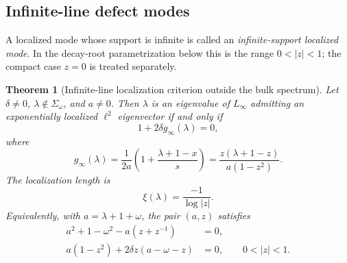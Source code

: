 \documentclass[twoside,10pt]{article}
\numberwithin{equation}{section}
\theoremstyle{slbody}
\newtheorem{theorem}{Theorem}[section]
\theoremstyle{definition}
\theoremstyle{remark}
\begin{document}
\subsection{Infinite-line defect modes}

A localized mode whose support is infinite is called an
\emph{infinite-support localized mode}.  In the decay-root parametrization
below this is the range $0<|z|<1$; the compact case $z=0$ is treated
separately.

\begin{theorem}[Infinite-line localization criterion outside the bulk spectrum]
\label{thm:localization}
Let $\delta\ne0$, $\lambda\notin\Sigma_\omega$, and $a\ne0$.  Then
$\lambda$ is an eigenvalue of $L_\infty$ admitting an exponentially
localized $\ell^2$ eigenvector if and only if
\begin{equation}\label{eq:localization-secular}
 1+2\delta g_\infty(\lambda)=0,
\end{equation}
where
\begin{equation}\label{eq:localization-green}
 g_\infty(\lambda)
 =\frac1{2a}\left(1+\frac{\lambda+1-x}{s}\right)
 =\frac{z(\lambda+1-z)}{a(1-z^2)}.
\end{equation}
The localization length is
\[
 \xi(\lambda)=\frac{-1}{\log|z|}.
\]
Equivalently, with $a=\lambda+1+\omega$, the pair $(a,z)$ satisfies
\begin{align}
 a^2+1-\omega^2-a(z+z^{-1})&=0,\label{eq:loc-dispersion}\\
 a(1-z^2)+2\delta z(a-\omega-z)&=0,
 \qquad 0<|z|<1.\label{eq:loc-match}
\end{align}
\end{theorem}
\end{document}
